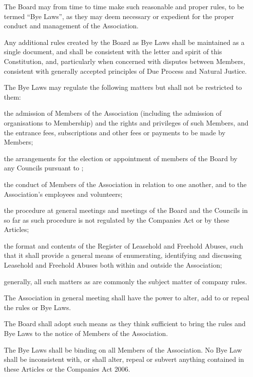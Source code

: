 \documentclass[10pt]{mk-articles-of-association}
\newcommand{\EC}[0]{Board}
\newcommand{\Exec}[0]{\EC{} }
\newcommand{\LAFA}[0]{Leasehold and Freehold Abuses}
\begin{document}
\begin{constenum}

\item The \Exec may from time to time make such reasonable and proper
  rules, to be termed ``Bye Laws'', as they may deem necessary or
  expedient for the proper conduct and management of the Association.

\item Any additional rules created by the \Exec as Bye Laws
  shall be maintained as a single document, and shall be
  consistent with the letter and spirit of this Constitution, and,
  particularly when concerned with disputes between Members,
  consistent with generally accepted principles of Due Process and
  Natural Justice.

\item The Bye Laws may regulate the following matters but shall not be
  restricted to them:

\begin{constenum}

\item the admission of Members of the Association (including the admission
  of organisations to Membership) and the rights and privileges of
  such Members, and the entrance fees, subscriptions and other fees or
  payments to be made by Members;

\item the arrangements for the election or appointment of members of
  the \Exec by any Councils pursuant to
  ;

\item the conduct of Members of the Association in relation to one
  another, and to the Association's employees and volunteers;

\item the procedure at general meetings and meetings of the \Exec and
  the Councils in so far as such procedure is not regulated by the
  Companies Act or by these Articles;

\item the format and contents of the Register of \LAFA, such that
  it shall provide a general means of enumerating, identifying and
  discussing \LAFA{} both within and outside the Association; \ITand

\item generally, all such matters as are commonly the subject matter
  of company rules.

\end{constenum}

\item The Association in general meeting shall have the power to
  alter, add to or repeal the rules or Bye Laws.

\item The \Exec shall adopt such means as they think sufficient to
  bring the rules and Bye Laws to the notice of Members of the Association.

\item The Bye Laws shall be binding on all Members of the
  Association. No Bye Law shall be inconsistent with, or shall
  alter, repeal or subvert anything contained in these Articles or
  the Companies Act 2006.
\end{constenum}
\end{document}
